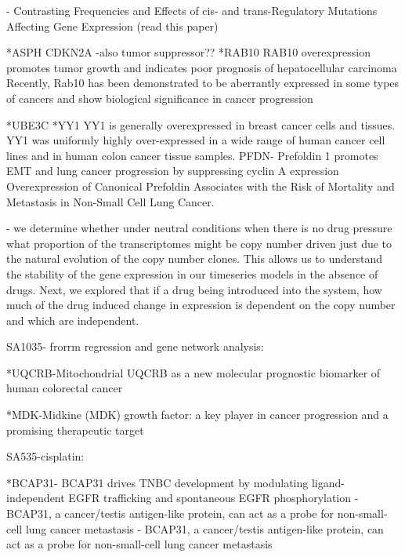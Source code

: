 


- Contrasting Frequencies and Effects of cis- and trans-Regulatory Mutations Affecting Gene Expression (read this paper)




*ASPH \cite{li2018expression, hou2018recent, kanwal2020aspartate, lin2019asph}
CDKN2A \cite{shahidsales2018genetic}-also tumor suppressor??
*RAB10 \cite{wang2017rab10}RAB10 overexpression promotes tumor growth and indicates poor prognosis of hepatocellular carcinoma
Recently, Rab10 has been demonstrated to be aberrantly expressed in some types of cancers and show biological significance in cancer progression \cite{he2002identification, jiang2016mir}

*UBE3C \cite{xiong2019mir, pan2015ubiquitin, zhang2020ube3c}
*YY1 \cite{wan2012yin, chinnappan2009transcription, meliala2020biological} 
YY1 is generally overexpressed in breast cancer cells and tissues.
YY1 was uniformly highly over-expressed in a wide range of human cancer cell lines and in human colon cancer tissue samples.
PFDN-   Prefoldin 1 promotes EMT and lung cancer progression by suppressing cyclin A expression
Overexpression of Canonical Prefoldin Associates with the Risk of Mortality and Metastasis in Non-Small Cell Lung Cancer. 



- we determine whether under neutral conditions when there is no drug pressure what proportion of the transcriptomes might be copy number driven just due to the natural evolution of the copy number clones. This allows us to understand the stability of the gene expression in our timeseries models in the absence of drugs. 
 Next, we explored that if a drug being introduced into the system, how much of the drug induced change in expression is dependent on the copy number and which are independent.

SA1035- frorrm regression and gene network analysis:

*UQCRB-Mitochondrial UQCRB as a new molecular prognostic biomarker of human colorectal cancer

*MDK-Midkine (MDK) growth factor: a key player in cancer progression and a promising therapeutic target

SA535-cisplatin:

*BCAP31- BCAP31 drives TNBC development by modulating ligand-independent EGFR trafficking and spontaneous EGFR phosphorylation
-BCAP31, a cancer/testis antigen-like protein, can act as a probe for non-small-cell lung cancer metastasis
- BCAP31, a cancer/testis antigen-like protein, can act as a probe for non-small-cell lung cancer metastasis

